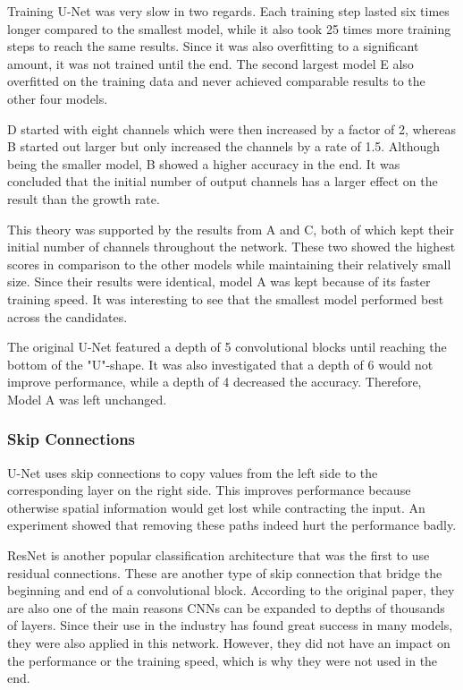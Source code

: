 Training U-Net was very slow in two regards. Each training step lasted six times longer compared to the smallest model, while it also took 25 times more training steps to reach the same results. Since it was also overfitting to a significant amount, it was not trained until the end. The second largest model E also overfitted on the training data and never achieved comparable results to the other four models.

D started with eight channels which were then increased by a factor of 2, whereas B started out larger but only increased the channels by a rate of 1.5. Although being the smaller model, B showed a higher accuracy in the end. It was concluded that the initial number of output channels has a larger effect on the result than the growth rate.

This theory was supported by the results from A and C, both of which kept their initial number of channels throughout the network. These two showed the highest scores in comparison to the other models while maintaining their relatively small size. Since their results were identical, model A was kept because of its faster training speed. It was interesting to see that the smallest model performed best across the candidates.

The original U-Net featured a depth of 5 convolutional blocks until reaching the bottom of the "U"-shape. It was also investigated that a depth of 6 would not improve performance, while a depth of 4 decreased the accuracy. Therefore, Model A was left unchanged.

\subsubsection{Skip Connections}

U-Net uses skip connections to copy values from the left side to the corresponding layer on the right side. This improves performance because otherwise spatial information would get lost while contracting the input. An experiment showed that removing these paths indeed hurt the performance badly.

ResNet \cite{He2015b} is another popular classification architecture that was the first to use residual connections. These are another type of skip connection that bridge the beginning and end of a convolutional block. According to the original paper, they are also one of the main reasons CNNs can be expanded to depths of thousands of layers. Since their use in the industry has found great success in many models, they were also applied in this network. However, they did not have an impact on the performance or the training speed, which is why they were not used in the end.

